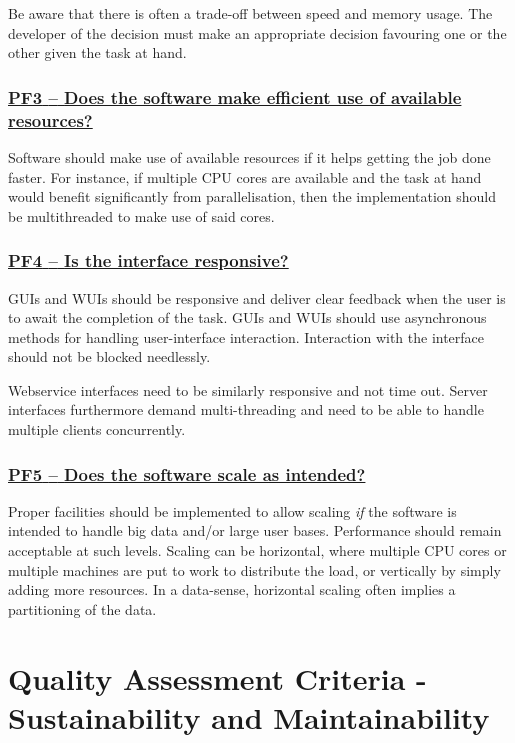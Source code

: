 \documentclass[a4paper,11pt]{article}
\newcommand{\criterion}[1]{\subsubsection*{\underline{#1}}}
\begin{document}
Be aware that there is often a trade-off between speed and memory usage. The
developer of the decision must make an appropriate decision favouring one or the other
given the task at hand. 

\newcommand{\pfThreeID}{PF3}
\newcommand{\pfThreeText}{Does the software make efficient use of available resources?}
\criterion{\pfThreeID{ }--{ }\pfThreeText}\label{id:pf3} 

Software should make use of available resources if it helps getting the job
done faster. For instance, if multiple CPU cores are available and the task at hand
would benefit significantly from parallelisation, then the implementation should be
multithreaded to make use of said cores.

\newcommand{\pfFourID}{PF4}
\newcommand{\pfFourText}{Is the interface responsive?}
\criterion{\pfFourID{ }--{ }\pfFourText}\label{id:pf4}

GUIs and WUIs should be responsive and deliver clear feedback when the user is
to await the completion of the task. GUIs and WUIs should use asynchronous methods for
handling user-interface interaction. Interaction with the interface should not
be blocked needlessly.

Webservice interfaces need to be similarly responsive and not time out. Server interfaces furthermore demand multi-threading and need to be able to handle
multiple clients concurrently.

\newcommand{\pfFiveID}{PF5}
\newcommand{\pfFiveText}{Does the software scale as intended?}
\criterion{\pfFiveID{ }--{ }\pfFiveText}\label{id:pf5} 

Proper facilities should be implemented to allow scaling \emph{if} the software is
intended to handle big data and/or large user bases. Performance should remain
acceptable at such levels.  Scaling can be horizontal, where multiple CPU cores
or multiple machines are put to work to distribute the load, or vertically by
simply adding more resources. In a data-sense, horizontal scaling often implies
a partitioning of the data.

\section{Quality Assessment Criteria - Sustainability and Maintainability}\label{sec:sustAndMaint}
\end{document}
